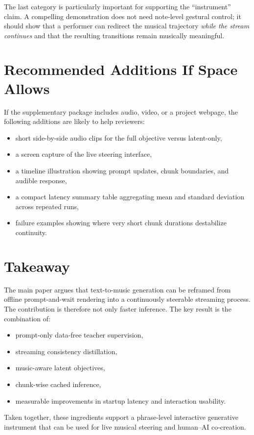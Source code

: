 \documentclass[11pt]{article}
\begin{document}
The last category is particularly important for supporting the ``instrument'' claim. A compelling demonstration does not need note-level gestural control; it should show that a performer can redirect the musical trajectory \emph{while the stream continues} and that the resulting transitions remain musically meaningful.

\section{Recommended Additions If Space Allows}

If the supplementary package includes audio, video, or a project webpage, the following additions are likely to help reviewers:
\begin{itemize}
    \item short side-by-side audio clips for the full objective versus latent-only,
    \item a screen capture of the live steering interface,
    \item a timeline illustration showing prompt updates, chunk boundaries, and audible response,
    \item a compact latency summary table aggregating mean and standard deviation across repeated runs,
    \item failure examples showing where very short chunk durations destabilize continuity.
\end{itemize}

\section{Takeaway}

The main paper argues that text-to-music generation can be reframed from offline prompt-and-wait rendering into a continuously steerable streaming process. The contribution is therefore not only faster inference. The key result is the combination of:
\begin{itemize}
    \item prompt-only data-free teacher supervision,
    \item streaming consistency distillation,
    \item music-aware latent objectives,
    \item chunk-wise cached inference,
    \item measurable improvements in startup latency and interaction usability.
\end{itemize}

Taken together, these ingredients support a phrase-level interactive generative instrument that can be used for live musical steering and human--AI co-creation.
\end{document}
